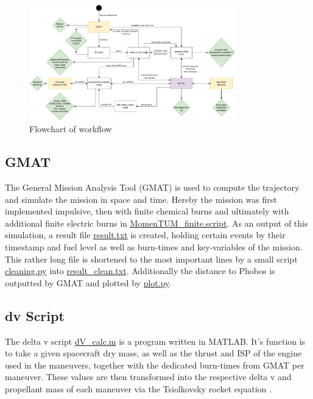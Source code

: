\documentclass[conference]{IEEEtran}
\begin{document}
\begin{figure}[h]
  \centering
  \includegraphics[width=0.8\textwidth]{img/work_flow.pdf}
  \caption{Flowchart of workflow}
  \label{fig:flow-work}
\end{figure}

\subsection{GMAT}

The General Mission Analysis Tool (GMAT) is used to compute the trajectory and simulate the mission in space and time.
Hereby the mission was first implemented impulsive, then with finite chemical burns and ultimately with additional  finite electric burns in \href{https://github.com/Sven-J-Steinert/MomenTUM/blob/main/GMAT/MomenTUM_finite.script}{\colorbox{codegray}{MomenTUM\_finite.script}}.
As an output of this simulation, a result file \href{https://github.com/Sven-J-Steinert/MomenTUM/blob/main/GMAT/result/result.txt}{\colorbox{codegray}{result.txt}} is created, holding certain events by their timestamp and fuel level as well as burn-times and key-variables of the mission. This rather long file is shortened to the most important lines by a small script \href{https://github.com/Sven-J-Steinert/MomenTUM/blob/main/GMAT/cleaning.py}{\colorbox{codegray}{cleaning.py}} into \href{https://github.com/Sven-J-Steinert/MomenTUM/blob/main/GMAT/result/result_clean.txt}{\colorbox{codegray}{result\_clean.txt}}. Additionally the distance to Phobos is outputted by GMAT and plotted by 
\href{https://github.com/Sven-J-Steinert/MomenTUM/blob/main/GMAT/plot.py}{\colorbox{codegray}{plot.py}}.


\subsection{dv Script}

The delta v script \href{https://github.com/Sven-J-Steinert/MomenTUM/blob/main/MATLAB/dV_calc.m}{\colorbox{codegray}{dV\_calc.m}} is a program written in MATLAB. It's function is to take a given spacecraft dry mass, as well as the thrust and ISP of the engine used in the maneuvers, together with the dedicated burn-times from GMAT per maneuver. These values are then transformed into the respective delta v and propellant mass of each maneuver via the Tsiolkovsky rocket equation \cite{Walter.2018}.
\end{document}

